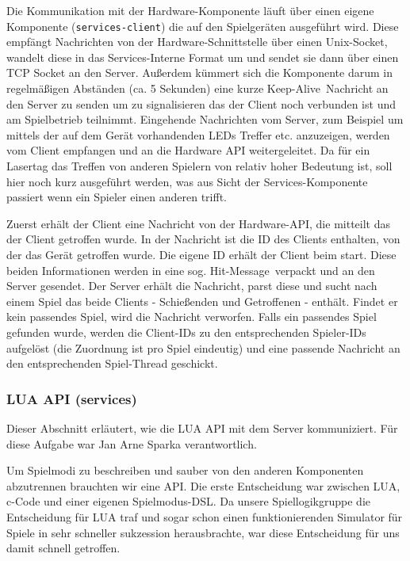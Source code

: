 Die Kommunikation mit der Hardware-Komponente läuft über einen eigene Komponente (\texttt{services-client}) die auf den Spielgeräten ausgeführt wird. Diese empfängt Nachrichten von der Hardware-Schnittstelle über einen Unix-Socket, wandelt diese in das Services-Interne Format um und sendet sie dann über einen TCP Socket an den Server. Außerdem kümmert sich die Komponente darum in regelmäßigen Abständen (ca. 5 Sekunden) eine kurze \glqq Keep-Alive\grqq \, Nachricht an den Server zu senden um zu signalisieren das der Client noch verbunden ist und am Spielbetrieb teilnimmt. 
Eingehende Nachrichten vom Server, zum Beispiel um mittels der auf dem Gerät vorhandenden LEDs Treffer etc. anzuzeigen, werden vom Client empfangen und an die Hardware API weitergeleitet.\newline \newline
Da für ein Lasertag das Treffen von anderen Spielern von relativ hoher Bedeutung ist, soll hier noch kurz ausgeführt werden, was aus Sicht der Services-Komponente passiert wenn ein Spieler einen anderen trifft.

Zuerst erhält der Client eine Nachricht von der Hardware-API, die mitteilt das der Client getroffen wurde. In der Nachricht ist die ID des Clients enthalten, von der das Gerät getroffen wurde. Die eigene ID erhält der Client beim start. Diese beiden Informationen werden in eine sog. \glqq Hit-Message\grqq \, verpackt und an den Server gesendet. 
Der Server erhält die Nachricht, parst diese und sucht nach einem Spiel das beide Clients - Schießenden und Getroffenen - enthält. Findet er kein passendes Spiel, wird die Nachricht verworfen. Falls ein passendes Spiel gefunden wurde, werden die Client-IDs zu den entsprechenden Spieler-IDs aufgelöst (die Zuordnung ist pro Spiel eindeutig) und eine passende Nachricht an den entsprechenden Spiel-Thread geschickt.

\subsubsection{LUA API (services)}
Dieser Abschnitt erläutert, wie die LUA API mit dem Server kommuniziert. Für diese Aufgabe war Jan Arne Sparka verantwortlich.

Um Spielmodi zu beschreiben und sauber von den anderen Komponenten abzutrennen brauchten wir eine API. Die erste Entscheidung war zwischen LUA, c-Code und einer eigenen Spielmodus-DSL. Da unsere Spiellogikgruppe die Entscheidung für LUA traf und sogar schon einen funktionierenden Simulator für Spiele in sehr schneller sukzession herausbrachte, war diese Entscheidung für uns damit schnell getroffen.

